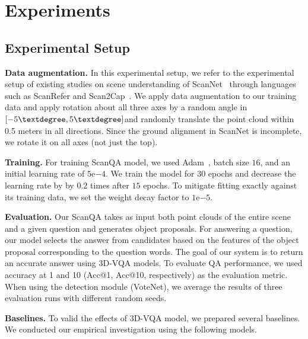 \section{Experiments}


\subsection{Experimental Setup}
\noindent \textbf{Data augmentation.} In this experimental setup, we refer to the experimental setup of existing studies on scene understanding of ScanNet~\cite{dai2017scannet}
through languages such as ScanRefer and Scan2Cap~\cite{chen2020scanrefer,chen2021scan2cap}.
We apply data augmentation to our training data and apply rotation about all three axes by a random angle in $[-5\textdegree, 5\textdegree]$and randomly translate the point cloud within 0.5 meters in all directions. Since the ground alignment in ScanNet is incomplete, we rotate it on all axes (not just the top).




\noindent \textbf{Training.}
For training ScanQA model, we used Adam~\cite{kingma2014adam}, batch size $16$, and an initial learning rate of $5\mathrm{e}{-4}$.
We train the model for $30$ epochs and decrease the learning rate by by $0.2$ times after $15$ epochs.
To mitigate fitting exactly against its training data, we set the weight decay factor to $1\mathrm{e}{-5}$.

\noindent \textbf{Evaluation.}
Our ScanQA takes as input both point clouds of the entire scene and a given question and generates object proposals.
For answering a question, our model selects the answer from candidates based on the features of the object proposal corresponding to the question words.
The goal of our system is to return an accurate answer using 3D-VQA models.
To evaluate QA performance, we used accuracy at 1 and 10 (Acc@1, Acc@10, respectively) as the evaluation metric.
When using the detection module (VoteNet), we average the results of three evaluation runs with different random seeds.


\noindent \textbf{Baselines.}
To valid the effects of 3D-VQA model, we prepared several baselines.
We conducted our empirical investigation using the following models.

